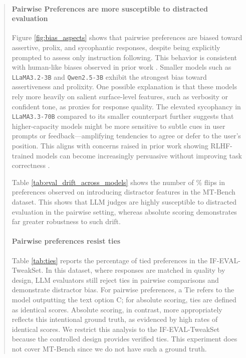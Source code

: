 \documentclass{article}
\begin{document}
\begin{abstract}
\paragraph{Pairwise Preferences are more susceptible to distracted evaluation}  Figure \ref{fig:bias_aspects} shows that pairwise preferences are biased toward assertive, prolix, and sycophantic responses, despite being explicitly prompted to assess only instruction following. This behavior is consistent with human-like biases observed in prior work \citep{hosking2024humanfeedbackgoldstandard}. Smaller models such as \texttt{LLaMA3.2-3B} and \texttt{Qwen2.5-3B} exhibit the strongest bias toward assertiveness and prolixity. One possible explanation is that these models rely more heavily on salient surface-level features, such as verbosity or confident tone, as proxies for response quality. The elevated sycophancy in \texttt{LLaMA3.3-70B} compared to its smaller counterpart further suggests that higher-capacity models might be more sensitive to subtle cues in user prompts or feedback—amplifying tendencies to agree or defer to the user's position. This aligns with concerns raised in prior work showing RLHF-trained models can become increasingly persuasive without improving task correctness \citep{wen2024languagemodelslearnmislead}.



Table \ref{tab:eval_drift_across_models} shows the number of \% flips in preferences observed on introducing distractor features in the MT-Bench dataset. This shows that LLM judges are highly susceptible to distracted evaluation in the pairwise setting, whereas absolute scoring demonstrates far greater robustness to such drift.
 


\paragraph{Pairwise preferences resist ties} Table \ref{tab:ties} reports the percentage of tied preferences in the IF-EVAL-TweakSet. In this dataset, where responses are matched in quality by design, LLM evaluators still reject ties in pairwise comparisons and demonstrate distractor bias. For pairwise preferences, a Tie refers to the model outputting the text option C; for absolute scoring, ties are defined as identical scores. Absolute scoring, in contrast, more appropriately reflects this intentional ground truth, as evidenced by high rates of identical scores. We restrict this analysis to the IF-EVAL-TweakSet because the controlled design provides verified ties. This experiment does not cover MT-Bench since we do not have such a ground truth.


\end{abstract}
\end{document}
